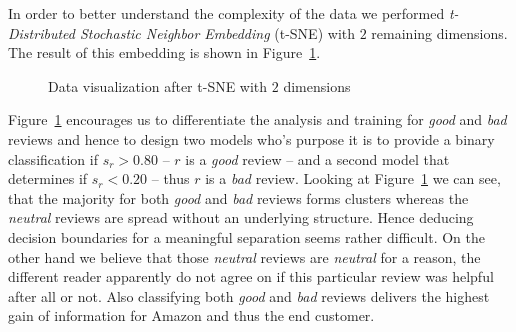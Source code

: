 \documentclass[a4paper,11pt]{article}
\begin{document}
In order to better understand the complexity of the data we performed \textit{t-Distributed Stochastic Neighbor Embedding} (t-SNE) \cite{tsne} with $2$ remaining dimensions. The result of this embedding is shown in Figure~\ref{pic:tsne}.

\begin{figure}[ht!]
		\begin{center}
		\end{center}
\caption{Data visualization after t-SNE with $2$ dimensions}
\label{pic:tsne}
\end{figure}

Figure~\ref{pic:tsne} encourages us to differentiate the analysis and training for \textit{good} and \textit{bad} reviews and hence to design two models who's purpose it is to provide a binary classification if $s_r > 0.80$ -- $r$ is a \textit{good} review -- and a second model that determines if $s_r < 0.20$ -- thus $r$ is a \textit{bad} review. Looking at Figure~\ref{pic:tsne} we can see, that the majority for both \textit{good} and \textit{bad} reviews forms clusters whereas the \textit{neutral} reviews are spread without an underlying structure. Hence deducing decision boundaries for a meaningful separation seems rather difficult. On the other hand we believe that those \textit{neutral} reviews are \textit{neutral} for a reason, the different reader apparently do not agree on if this particular review was helpful after all or not. Also classifying both \textit{good} and \textit{bad} reviews delivers the highest gain of information for Amazon and thus the end customer. 
\end{document}
